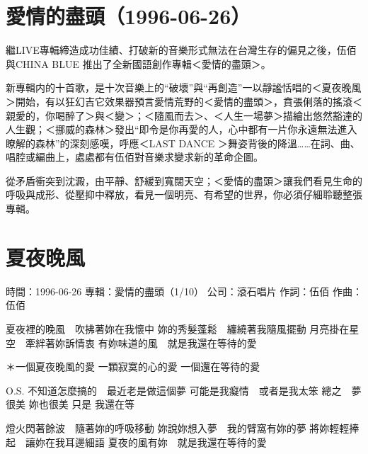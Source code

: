 \documentclass[UTF8,a4paper,oneside,twocolumn,12pt]{ctexbook}
\newcommand{\infopair}[2]{\textbullet #1：#2}
\newcommand{\zc}[1][伍佰]{\infopair{作詞}{#1}}
\newcommand{\zq}[1][伍佰]{\infopair{作曲}{#1}}
\newcommand{\zj}[1]{\infopair{專輯}{#1}}
\newcommand{\sj}[1]{\infopair{時間}{#1}}
\newcommand{\gs}[1]{\infopair{公司}{#1}}
\newenvironment{info}{\begin{flushleft}\kaishu
	}
	{\end{flushleft}\normalsize\yahei\par}
\newenvironment{lyric}{
	}
{}
\begin{document}
\section*{愛情的盡頭（1996-06-26）}
繼LIVE專輯締造成功佳績、打破新的音樂形式無法在台灣生存的偏見之後，伍佰與CHINA BLUE 推出了全新國語創作專輯＜愛情的盡頭＞。

新專輯内的十首歌，是十次音樂上的“破壞”與“再創造”一以靜謐恬唱的＜夏夜晚風＞開始，有以狂幻吉它效果器預言愛情荒野的＜愛情的盡頭＞，賁張俐落的搖滾＜親愛的，你喝醉了＞與＜變＞；＜隨風而去＞、＜人生一場夢＞描繪出悠然豁達的人生觀；＜挪威的森林＞發出“即令是你再愛的人，心中都有一片你永遠無法進入瞭解的森林”的深刻感嘆，呼應＜LAST DANCE ＞舞姿背後的降溫……在詞、曲、唱腔或編曲上，處處都有伍佰對音樂求變求新的革命企圖。

從矛盾衝突到沈澱，由平靜、舒緩到寬闊天空；＜愛情的盡頭＞讓我們看見生命的呼吸與成形、從壓抑中釋放，看見一個明亮、有希望的世界，你必須仔細聆聽整張專輯。

\section{夏夜晚風}
\begin{info}
	\sj{1996-06-26}
	\zj{愛情的盡頭（1/10）}
	\gs{滾石唱片}
	\zc
	\zq
\end{info}
\begin{lyric}
	夏夜裡的晚風　吹拂著妳在我懷中
	妳的秀髮蓬鬆　纏繞著我隨風擺動
	月亮掛在星空　牽絆著妳訴情衷
	有妳味道的風　就是我還在等待的愛

	＊一個夏夜晚風的愛
	一顆寂寞的心的愛
	一個還在等待的愛

	O.S. 不知道怎麼搞的　最近老是做這個夢
	可能是我癡情　或者是我太笨
	總之　夢很美
	妳也很美
	只是
	我還在等

	燈火閃著餘波　隨著妳的呼吸移動
	妳說妳想入夢　我的臂窩有妳的夢
	將妳輕輕捧起　讓妳在我耳邊細語
	夏夜的風有妳　就是我還在等待的愛
\end{lyric}
\end{document}

